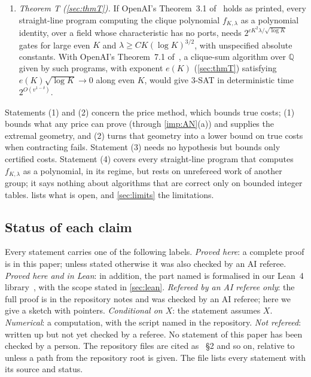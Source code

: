 \documentclass[10pt]{amsart}
\theoremstyle{plain}
\theoremstyle{definition}
\theoremstyle{remark}
\numberwithin{equation}{section}
\newcommand{\Q}{\mathbb{Q}}
\begin{document}
\begin{enumerate}[label=(\arabic*)]
a proof method.
\item \emph{Theorem T (\cref{sec:thmT}).} If OpenAI's Theorem~3.1 of~\cite{OpenAIHC} holds as
printed, every straight-line program computing the clique polynomial $f_{K,\lambda}$ as a polynomial
identity, over a field whose characteristic has no ports, needs $2^{cK^2\lambda/\sqrt{\log K}}$ gates
for large even $K$ and $\lambda\ge CK(\log K)^{3/2}$, with unspecified absolute constants. With OpenAI's
Theorem~7.1 of~\cite{OpenAIIM}, a clique-sum algorithm over $\Q$ given by such programs, with exponent
$e(K)$ (\cref{sec:thmT}) satisfying $e(K)\sqrt{\log K}\to0$ along even $K$, would give 3-SAT in
deterministic time $2^{O(v^{1-\delta})}$.
\end{enumerate}

Statements (1) and (2) concern the price method, which bounds true costs; (1) bounds what any price
can prove (through \cref{imp:AN}(a)) and supplies the extremal geometry, and (2) turns that geometry
into a lower bound on true costs when contracting fails. Statement (3) needs no hypothesis but bounds
only certified costs. Statement (4) covers every straight-line program that computes $f_{K,\lambda}$ as
a polynomial, in its regime, but rests on unrefereed work of another group; it says nothing about
algorithms that are correct only on bounded integer tables.
 lists what is open, and \cref{sec:limits} the limitations.

\subsection{Status of each claim}\label{sec:status}
Every statement carries one of the following labels.
\emph{Proved here}: a complete proof is in this paper; unless stated otherwise it was also checked by
an AI referee. \emph{Proved here and in Lean}: in addition, the part named is formalised in our
Lean~4 library~\cite{Lean4,Mathlib20}, with the scope stated in \cref{sec:lean}. \emph{Refereed by an
AI referee only}: the full proof is in the repository notes and was checked by an AI referee; here we
give a sketch with pointers. \emph{Conditional on $X$}: the statement assumes $X$. \emph{Numerical}:
a computation, with the script named in the repository. \emph{Not refereed}: written up but not yet
checked by a referee. No statement of this paper has been checked by a person. The repository files
are cited as ~\S2 and so on, relative to  unless a path from the repository root
is given. The file  lists every statement with its source and status.
\end{document}
